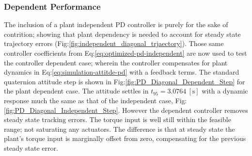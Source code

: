 \subsubsection{Dependent Performance}
\label{subsubsec:simulation.atttiude.pd.dependent}
The inclusion of a plant independent PD controller is purely for the sake of contrition; showing that plant dependency is needed to account for steady state trajectory errors (Fig:\ref{fig:independent_diagonal_trjaectory}). Those same controller coefficients from Eq:\ref{eq:optimized-pd-independent} are now used to test the controller dependent case; wherein the controller compensates for plant dynamics in Eq:\ref{eq:simulation-attitde-pd} with a feedback terms. The standard quaternion attitude step is shown in Fig:\ref{fig:PD_Diagonal_Dependent_Step} for the plant dependent case. The attitude settles in $t_{95}=3.0764~[\text{s}]$ with a dynamic response much the same as that of the independent case, Fig:\ref{fig:PD_Diagonal_Independent_Step}. However the dependent controller removes steady state tracking errors. The torque input is well still within the feasible range; not saturating any actuators. The difference is that at steady state the plant's torque input is marginally offset from zero, compensating for the previous steady state error.
\par
